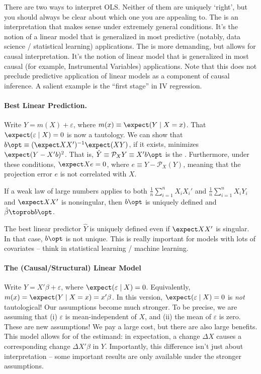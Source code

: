 \documentclass[10pt]{article}
\begin{document}
There are two ways to interpret OLS. Neither of them are uniquely `right', but you should always be clear about which one you are appealing to. The  is an interpretation that makes sense under extremely general conditions. It's the notion of a linear model that is generalized in most predictive (notably, data science / statistical learning) applications. The  is more demanding, but allows for causal interpretation. It's the notion of linear model that is generalized in most causal (for example, Instrumental Variables) applications. Note that this does not preclude predictive application of linear models as a component of causal inference. A salient example is the ``first stage'' in IV regression.

\paragraph{Best Linear Prediction.} Write $Y = m(X) + \varepsilon$, where $m(x) \equiv \expect(Y \mid X = x)$. That $\expect(\varepsilon \mid X) = 0$ is now a tautology. We can show that $b\opt \equiv (\expect XX')^{-1} \expect(XY)$, if it exists, minimizes $\expect(Y - X'b)^2$. That is, $\hat{Y} \equiv \mathcal{P}_XY \equiv X'b\opt$ is the . Furthermore, under these conditions, $\expect Xe=0$, where $e \equiv Y - \mathcal{P}_X(Y)$, meaning that the projection error $e$ is not correlated with $X$.

\begin{theorem}
	If a weak law of large numbers applies to both $\frac{1}{n}\sum_{i=1}^n X_i X_i'$ and $\frac{1}{n}\sum_{i=1}^n X_iY_i$ and $\expect XX'$ is nonsingular, then $b\opt$ is uniquely defined and $\hat{\beta} \toprob b\opt$.
\end{theorem}
\begin{remark}
	The best linear predictor $\hat{Y}$ is uniquely defined even if $\expect XX'$ is singular. In that case, $b\opt$ is not unique. This is really important for models with lots of covariates -- think in statistical learning / machine learning.
\end{remark}

\paragraph{The (Causal/Structural) Linear Model} Write $Y = X'\beta + \varepsilon$, where $\expect(\varepsilon \mid X ) = 0$. Equivalently, $m(x) = \expect(Y \mid X = x) = x'\beta$. In this version, $\expect(\varepsilon \mid X) = 0$ is \emph{not} tautological! Our assumptions become much stronger. To be precise, we are assuming that (i) $\varepsilon$ is mean-independent of $X$, and (ii) the mean of $\varepsilon$ is zero. These are new assumptions! We pay a large cost, but there are also large benefits. This model allows for  of the estimand: in expectation, a change $\Delta X$ causes a corresponding change $\Delta X'\beta$ in $Y$. Importantly, this difference isn't just about interpretation -- some important results are only available under the stronger assumptions.
\end{document}

